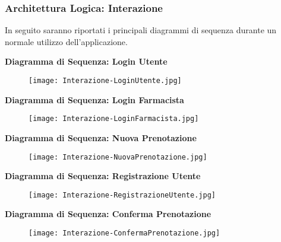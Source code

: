 \newpage

\subsubsection{Architettura Logica: Interazione}

In seguito saranno riportati i principali diagrammi di sequenza durante un normale utilizzo dell'applicazione.
\hfill \break

\textbf{Diagramma di Sequenza: Login Utente}

\begin{figure}[h!]
    \begin{center}
        \texttt{[image: Interazione-LoginUtente.jpg]}
    \end{center}
\end{figure}

\textbf{Diagramma di Sequenza: Login Farmacista}

\begin{figure}[h!]
    \begin{center}
        \texttt{[image: Interazione-LoginFarmacista.jpg]}
    \end{center}
\end{figure}
\hfill \break

\textbf{Diagramma di Sequenza: Nuova Prenotazione}

\begin{figure}[h!]
    \begin{center}
        \texttt{[image: Interazione-NuovaPrenotazione.jpg]}
    \end{center}
\end{figure}

\newpage

\textbf{Diagramma di Sequenza: Registrazione Utente}

\begin{figure}[h!]
    \begin{center}
        \texttt{[image: Interazione-RegistrazioneUtente.jpg]}
    \end{center}
\end{figure}
\hfill \break

\textbf{Diagramma di Sequenza: Conferma Prenotazione}

\begin{figure}[h!]
    \begin{center}
        \texttt{[image: Interazione-ConfermaPrenotazione.jpg]}
    \end{center}
\end{figure}
\newpage

